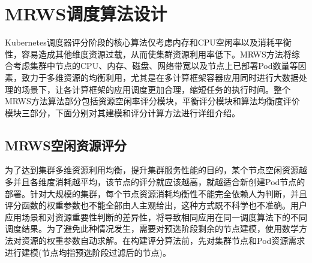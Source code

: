 \section{MRWS调度算法设计}
Kubernetes调度器评分阶段的核心算法仅考虑内存和CPU空闲率以及消耗平衡性，容易造成其他维度资源过载，从而使集群资源利用率低下。MRWS方法将综合考虑集群中节点的CPU、内存、磁盘、网络带宽以及节点上已部署Pod数量等因素，致力于多维资源的均衡利用，尤其是在多计算框架容器应用同时进行大数据处理的场景下，让各计算框架的应用调度更加合理，缩短任务的执行时间。整个MRWS方法算法部分包括资源空闲率评分模块，平衡评分模块和算法均衡度评价模块三部分，下面分别对其建模和评分计算方法进行详细介绍。

\subsection{MRWS空闲资源评分}
为了达到集群多维资源利用均衡，提升集群服务性能的目的，某个节点空闲资源越多并且各维度消耗越平均，该节点的评分就应该越高，就越适合新创建Pod节点的部署。针对大规模的集群，每个节点资源消耗均衡性不能完全依赖人为判断，并且评分函数的权重参数也不能全部由人主观给出，这种方式既不科学也不准确。用户应用场景和对资源重要性判断的差异性，将导致相同应用在同一调度算法下的不同调度结果。为了避免此种情况发生，需要对预选阶段剩余的节点建模，使用数学方法对资源的权重参数自动求解。在构建评分算法前，先对集群节点和Pod资源需求进行建模(节点均指预选阶段过滤后的节点)。
